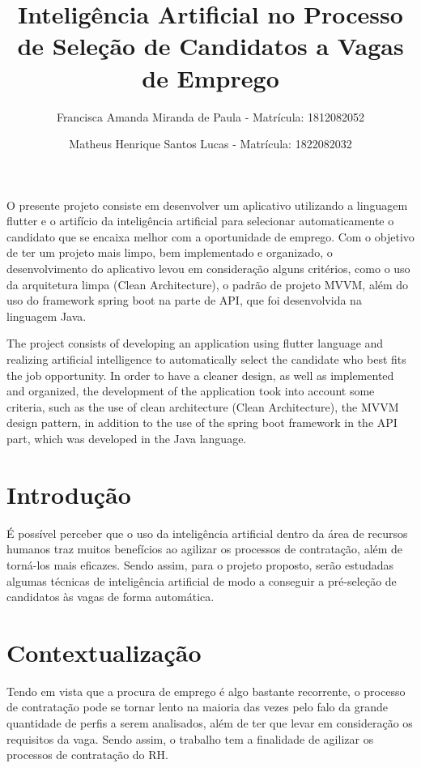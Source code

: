 \documentclass{document}
\begin{document}
        \title{Inteligência Artificial no Processo de Seleção de Candidatos a Vagas de Emprego}
        \author{Francisca Amanda Miranda de Paula - Matrícula: 1812082052}
        \author{Matheus Henrique Santos Lucas - Matrícula: 1822082032}


    O presente projeto consiste em desenvolver um aplicativo utilizando a linguagem flutter e o artifício da inteligência artificial para 
    selecionar automaticamente o candidato que se encaixa melhor com a oportunidade de emprego. Com o objetivo de ter um projeto mais limpo, bem
    implementado e organizado, o desenvolvimento do aplicativo levou em consideração alguns critérios, como o uso da arquitetura limpa (Clean 
    Architecture), o padrão de projeto MVVM, além do uso do framework spring boot na parte de API, que foi desenvolvida na linguagem Java. 

    
    The project consists of developing an application using flutter language and realizing artificial intelligence to
    automatically select the candidate who best fits the job opportunity. In order to have a cleaner design, as well as
    implemented and organized, the development of the application took into account some criteria, such as the use of clean architecture (Clean
    Architecture), the MVVM design pattern, in addition to the use of the spring boot framework in the API part, which was developed in the Java 
    language.

    \section{Introdução}

    É possível perceber que o uso da inteligência artificial dentro da área de recursos humanos traz muitos benefícios ao agilizar os processos
    de contratação, além de torná-los mais eficazes. Sendo assim, para o projeto proposto, serão estudadas algumas técnicas de inteligência 
    artificial de modo a conseguir a pré-seleção de candidatos às vagas de forma automática.
    
    \section{Contextualização}

    Tendo em vista que a procura de emprego é algo bastante recorrente, o processo de contratação pode se tornar lento na maioria das vezes pelo
    falo da grande quantidade de perfis a serem analisados, além de ter que levar em consideração os requisitos da vaga. Sendo assim, o trabalho 
    tem a finalidade de agilizar os processos de contratação do RH.  
    
\end{document}
